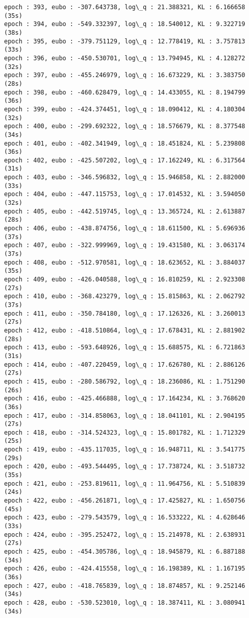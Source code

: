 \documentclass[11pt]{article}
\begin{document}
\begin{Verbatim}[commandchars=\\\{\}]
epoch : 393, eubo : -307.643738, log\_q : 21.388321, KL : 6.166658 (35s)
epoch : 394, eubo : -549.332397, log\_q : 18.540012, KL : 9.322719 (38s)
epoch : 395, eubo : -379.751129, log\_q : 12.778419, KL : 3.757813 (33s)
epoch : 396, eubo : -450.530701, log\_q : 13.794945, KL : 4.128272 (32s)
epoch : 397, eubo : -455.246979, log\_q : 16.673229, KL : 3.383750 (28s)
epoch : 398, eubo : -460.628479, log\_q : 14.433055, KL : 8.194799 (36s)
epoch : 399, eubo : -424.374451, log\_q : 18.090412, KL : 4.180304 (32s)
epoch : 400, eubo : -299.692322, log\_q : 18.576679, KL : 8.377548 (34s)
epoch : 401, eubo : -402.341949, log\_q : 18.451824, KL : 5.239808 (36s)
epoch : 402, eubo : -425.507202, log\_q : 17.162249, KL : 6.317564 (31s)
epoch : 403, eubo : -346.596832, log\_q : 15.946858, KL : 2.882000 (33s)
epoch : 404, eubo : -447.115753, log\_q : 17.014532, KL : 3.594050 (32s)
epoch : 405, eubo : -442.519745, log\_q : 13.365724, KL : 2.613887 (28s)
epoch : 406, eubo : -438.874756, log\_q : 18.611500, KL : 5.696936 (37s)
epoch : 407, eubo : -322.999969, log\_q : 19.431580, KL : 3.063174 (37s)
epoch : 408, eubo : -512.970581, log\_q : 18.623652, KL : 3.884037 (35s)
epoch : 409, eubo : -426.040588, log\_q : 16.810259, KL : 2.923308 (27s)
epoch : 410, eubo : -368.423279, log\_q : 15.815863, KL : 2.062792 (37s)
epoch : 411, eubo : -350.784180, log\_q : 17.126326, KL : 3.260013 (27s)
epoch : 412, eubo : -418.510864, log\_q : 17.678431, KL : 2.881902 (28s)
epoch : 413, eubo : -593.648926, log\_q : 15.688575, KL : 6.721863 (31s)
epoch : 414, eubo : -407.220459, log\_q : 17.626780, KL : 2.886126 (27s)
epoch : 415, eubo : -280.586792, log\_q : 18.236086, KL : 1.751290 (26s)
epoch : 416, eubo : -425.466888, log\_q : 17.164234, KL : 3.768620 (36s)
epoch : 417, eubo : -314.858063, log\_q : 18.041101, KL : 2.904195 (27s)
epoch : 418, eubo : -314.524323, log\_q : 15.801782, KL : 1.712329 (25s)
epoch : 419, eubo : -435.117035, log\_q : 16.948711, KL : 3.541775 (29s)
epoch : 420, eubo : -493.544495, log\_q : 17.738724, KL : 3.518732 (35s)
epoch : 421, eubo : -253.819611, log\_q : 11.964756, KL : 5.510839 (24s)
epoch : 422, eubo : -456.261871, log\_q : 17.425827, KL : 1.650756 (45s)
epoch : 423, eubo : -279.543579, log\_q : 16.533222, KL : 4.628646 (33s)
epoch : 424, eubo : -395.252472, log\_q : 15.214978, KL : 2.638931 (27s)
epoch : 425, eubo : -454.305786, log\_q : 18.945879, KL : 6.887188 (34s)
epoch : 426, eubo : -424.415558, log\_q : 16.198389, KL : 1.167195 (36s)
epoch : 427, eubo : -418.765839, log\_q : 18.874857, KL : 9.252146 (34s)
epoch : 428, eubo : -530.523010, log\_q : 18.387411, KL : 3.080941 (34s)

\end{Verbatim}
\end{document}

